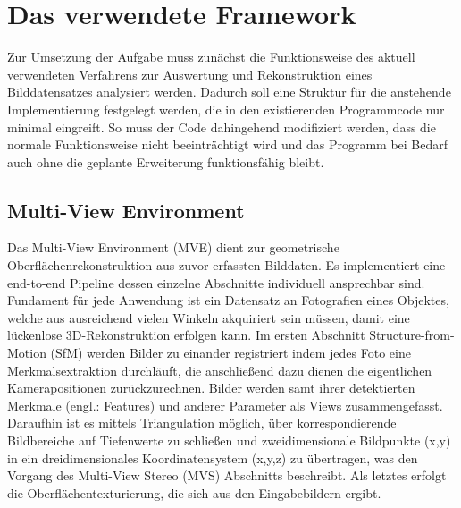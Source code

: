 \chapter{Das verwendete Framework}
Zur Umsetzung der Aufgabe muss zun\"achst die Funktionsweise des aktuell verwendeten Verfahrens zur Auswertung und Rekonstruktion eines Bilddatensatzes analysiert werden. Dadurch soll eine Struktur f\"ur die anstehende Implementierung festgelegt werden, die in den existierenden Programmcode nur minimal eingreift. So muss der Code dahingehend modifiziert werden, dass die normale Funktionsweise nicht beeintr\"achtigt wird und das Programm bei Bedarf auch ohne die geplante Erweiterung funktionsf\"ahig bleibt.


\section{Multi-View Environment}
Das Multi-View Environment (MVE)\cite{fuhrmann2014mve} dient zur geometrische Oberfl\"achenrekonstruktion aus zuvor erfassten Bilddaten. Es implementiert eine end-to-end Pipeline dessen einzelne Abschnitte individuell ansprechbar sind. Fundament f\"ur jede Anwendung ist ein Datensatz an Fotografien eines Objektes, welche aus ausreichend vielen Winkeln akquiriert sein m\"ussen, damit eine l\"uckenlose 3D-Rekonstruktion erfolgen kann. Im ersten Abschnitt Structure-from-Motion (SfM) werden Bilder zu einander registriert indem jedes Foto eine Merkmalsextraktion durchl\"auft, die anschlie\ss end dazu dienen die eigentlichen Kamerapositionen zur\"uckzurechnen. Bilder werden samt ihrer detektierten Merkmale (engl.: Features) und anderer Parameter als Views zusammengefasst. Daraufhin ist es mittels Triangulation m\"oglich, \"uber korrespondierende Bildbereiche auf Tiefenwerte zu schlie\ss en und zweidimensionale Bildpunkte (x,y) in ein dreidimensionales Koordinatensystem (x,y,z) zu \"ubertragen, was den Vorgang des Multi-View Stereo (MVS) Abschnitts beschreibt. Als letztes erfolgt die Oberfl\"achentexturierung, die sich aus den Eingabebildern ergibt.


